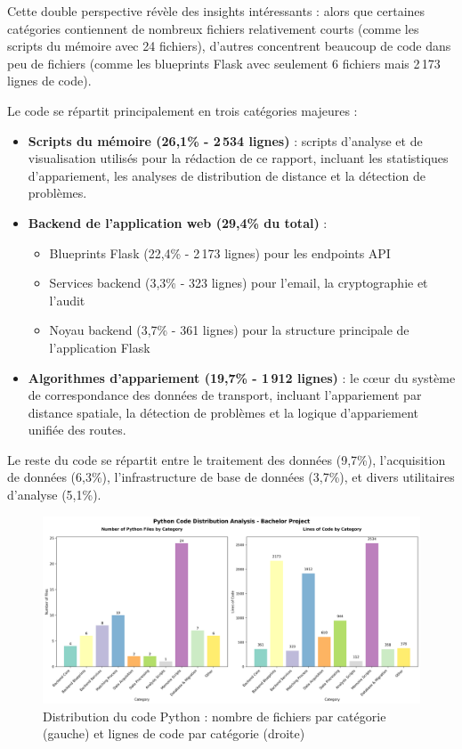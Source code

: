 Cette double perspective révèle des insights intéressants : alors que certaines catégories contiennent de nombreux fichiers relativement courts (comme les scripts du mémoire avec 24 fichiers), d'autres concentrent beaucoup de code dans peu de fichiers (comme les blueprints Flask avec seulement 6 fichiers mais 2\,173 lignes de code).

Le code se répartit principalement en trois catégories majeures :

\begin{itemize}
\item \textbf{Scripts du mémoire (26,1\% - 2\,534 lignes)} : scripts d'analyse et de visualisation utilisés pour la rédaction de ce rapport, incluant les statistiques d'appariement, les analyses de distribution de distance et la détection de problèmes.

\item \textbf{Backend de l'application web (29,4\% du total)} : 
\begin{itemize}
\item Blueprints Flask (22,4\% - 2\,173 lignes) pour les endpoints API
\item Services backend (3,3\% - 323 lignes) pour l'email, la cryptographie et l'audit
\item Noyau backend (3,7\% - 361 lignes) pour la structure principale de l'application Flask
\end{itemize}

\item \textbf{Algorithmes d'appariement (19,7\% - 1\,912 lignes)} : le cœur du système de correspondance des données de transport, incluant l'appariement par distance spatiale, la détection de problèmes et la logique d'appariement unifiée des routes.
\end{itemize}

Le reste du code se répartit entre le traitement des données (9,7\%), l'acquisition de données (6,3\%), l'infrastructure de base de données (3,7\%), et divers utilitaires d'analyse (5,1\%).

\begin{figure}[h]
\centering
\includegraphics[width=\textwidth]{figures/conclusion/python_distribution_analysis.png}
\caption{Distribution du code Python : nombre de fichiers par catégorie (gauche) et lignes de code par catégorie (droite)}
\label{fig:python_distribution}
\end{figure}


